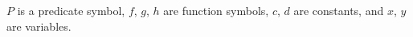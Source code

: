 $P$ is a predicate symbol, $f$, $g$, $h$ are function symbols, $c$, $d$ are constants, and $x$, $y$ are variables.
